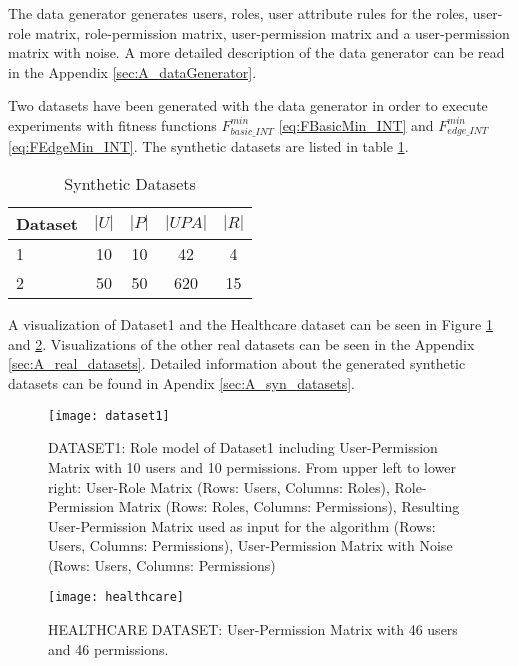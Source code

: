 The data generator generates users, roles, user attribute rules for the roles, user-role matrix, role-permission matrix, user-permission matrix and a user-permission matrix with noise. A more detailed description of the data generator can be read in the Appendix \ref{sec:A_dataGenerator}.

Two datasets have been generated with the data generator in order to execute experiments with fitness functions $F_{basic\_INT}^{min}$ \eqref{eq:FBasicMin_INT} and $F_{edge\_INT}^{min}$ \eqref{eq:FEdgeMin_INT}. The synthetic datasets are listed in table \ref{tab:syntheticDatasets}.

\begin{table}[H]
    \centering
    \begin{tabular}{|l|c|c|c|c|}
        \hline
        \rowcolor{myGray} 
        \textbf{Dataset} & \textbf{$|U|$} & \textbf{$|P|$} & \textbf{$|UPA|$} & \textbf{$|R|$}\\ \hline
        1       & 10    & 10   & 42    & 4\\ \hline
        2       & 50    & 50   & 620   & 15\\ \hline
    \end{tabular}
    \caption{Synthetic Datasets}
    \label{tab:syntheticDatasets}
\end{table}

A visualization of Dataset1 and the Healthcare dataset can be seen in Figure \ref{fig:dataset1} and \ref{fig:healthcare}. Visualizations of the other real datasets can be seen in the Appendix \ref{sec:A_real_datasets}. Detailed information about the generated synthetic datasets can be found in Apendix \ref{sec:A_syn_datasets}.

\begin{figure}[H]
    \centering
    \texttt{[image: dataset1]}
    \caption{DATASET1: Role model of Dataset1 including User-Permission Matrix with 10 users and 10 permissions. From upper left to lower right: User-Role Matrix (Rows: Users, Columns: Roles), Role-Permission Matrix (Rows: Roles, Columns: Permissions), Resulting User-Permission Matrix used as input for the algorithm (Rows: Users, Columns: Permissions), User-Permission Matrix with Noise (Rows: Users, Columns: Permissions)}
    \label{fig:dataset1}
\end{figure}

\begin{figure}[H]
    \centering
    \texttt{[image: healthcare]}
    \caption{HEALTHCARE DATASET: User-Permission Matrix with 46 users and 46 permissions.}
    \label{fig:healthcare}
\end{figure}

